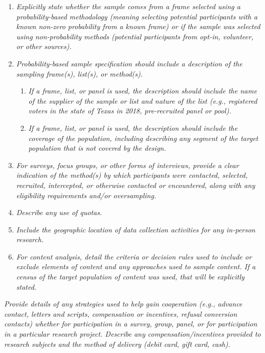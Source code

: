 \documentclass{article}
\begin{document}
\begin{enumerate}

\item \textit{Explicitly state whether the sample comes from a frame selected using a probability-based methodology (meaning selecting potential participants with a known non-zero probability from a known frame) or if the sample was selected using non-probability methods (potential participants from opt-in, volunteer, or other sources).}

\item \textit{Probability-based sample specification should include a description of the sampling frame(s), list(s), or method(s).}

\begin{enumerate}
  \item \textit{If a frame, list, or panel is used, the description should include the name of the supplier of the sample or list and nature of the list (e.g., registered voters in the state of Texas in 2018, pre-recruited panel or pool).}
  \item \textit{If a frame, list, or panel is used, the description should include the coverage of the population, including describing any segment of the target population that is not covered by the design.}
\end{enumerate}

\item \textit{For surveys, focus groups, or other forms of interviews, provide a clear indication of the method(s) by which participants were contacted, selected, recruited, intercepted, or otherwise contacted or encountered, along with any eligibility requirements and/or oversampling.}

\item \textit{Describe any use of quotas.}

\item \textit{Include the geographic location of data collection activities for any in-person research.}

\item \textit{For content analysis, detail the criteria or decision rules used to include or exclude elements of content and any approaches used to sample content. If a census of the target population of content was used, that will be explicitly stated.}

\end{enumerate}

\textit{Provide details of any strategies used to help gain cooperation (e.g., advance contact, letters and scripts, compensation or incentives, refusal conversion contacts) whether for participation in a survey, group, panel, or for participation in a particular research project. Describe any compensation/incentives provided to research subjects and the method of delivery (debit card, gift card, cash).}
\end{document}

